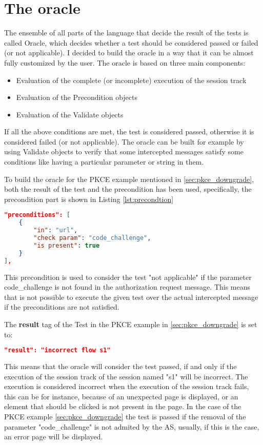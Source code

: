 \section{The oracle}
The ensemble of all parts of the language that decide the result of the tests is called Oracle,
which decides whether a test should be considered passed or failed (or not applicable). I decided to build the oracle in a way that it can be almost fully customized by the user. 
The oracle is based on three main components:
\begin{itemize}
    \item Evaluation of the complete (or incomplete) execution of the \gls{session track} 
    \item Evaluation of the Precondition objects
    \item Evaluation of the Validate objects
\end{itemize}
If all the above conditions are met, the test is considered passed, otherwise it is considered failed (or not applicable).
The oracle can be built for example by using Validate objects to verify that some intercepted messages satisfy some conditions like having a particular parameter or string in them.

To build the oracle for the PKCE example mentioned in \ref{sec:pkce_downgrade}, both the result of the test and the precondition has been used, specifically, the precondition part is shown in Listing \ref{lst:precondtion}
\begin{lstlisting}[language=json, caption=Precondition definition, label={lst:precondtion}]
"preconditions": [
    {
        "in": "url",
        "check param": "code_challenge",
        "is present": true
    }
],
\end{lstlisting}
This precondition is used to consider the test "not applicable" if the parameter code\_challenge is not found in the authorization request message. This means that is not possible to execute the given test over the actual intercepted message if the preconditions are not satisfied.

The \textbf{result} tag of the Test in the PKCE example in \ref{sec:pkce_downgrade} is set to:
\begin{lstlisting}[language=json]
"result": "incorrect flow s1"
\end{lstlisting}
This means that the oracle will consider the test passed, if and only if the execution of the \gls{session track} of the session named "s1" will be incorrect. The execution is considered incorrect when the execution of the \gls{session track} fails, this can be for instance, because of an unexpected page is displayed, or an element that should be clicked is not present in the page. In the case of the PKCE example \ref{sec:pkce_downgrade} the test is passed if the removal of the parameter "code\_challenge" is not admited by the AS, usually, if this is the case, an error page will be displayed.

